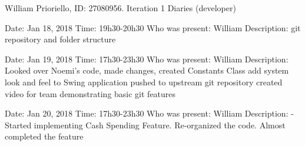 \documentclass{article}
\begin{document}
    \begin{center}
        William Prioriello, ID: 27080956.
        Iteration 1 Diaries (developer)
    \end{center}

    \begin{flushleft}
        Date: Jan 18, 2018 \newline
        Time: 19h30-20h30 \newline
        Who was present: William \newline
        Description: \newlineCreated git repository and folder structure \newline
    \end{flushleft}

    \vspace{2em}

    \begin{flushleft}
        Date: Jan 19, 2018 \newline
        Time: 17h30-23h30 \newline
        Who was present: William \newline
        Description: \newline Looked over Noemi's code, made changes, \newline
        created Constants Class \newline
        add system look and feel to Swing application \newline
        pushed to upstream git repository \newline
        created video for team demonstrating basic git features \newline
    \end{flushleft}
    \vspace{2em}

    \begin{flushleft}
        Date: Jan 20, 2018 \newline
        Time: 17h30-23h30 \newline
        Who was present: William \newline
        Description: \newline-Started implementing Cash Spending Feature. Re-organized the code.  \newline
        Almost completed the feature \newline
    \end{flushleft}
    \vspace{2em}
\end{document}
